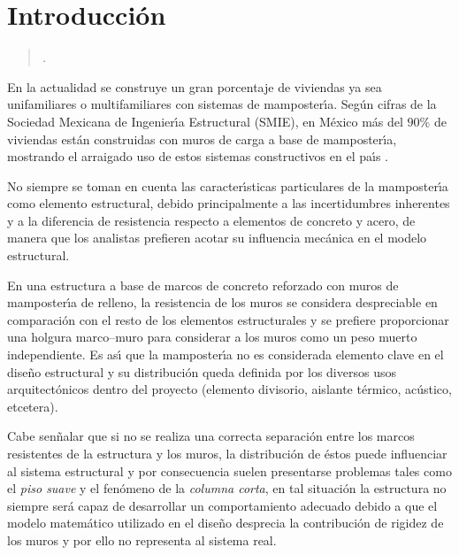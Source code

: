 
\chapter{Introducci\'on}

\begin{flushleft}
\begin{verse}
	\emph{.}
\newline
\end{verse}
\end{flushleft}


En la actualidad se construye un gran porcentaje de viviendas ya sea unifamiliares o multifamiliares con sistemas de mamposter\'{\i}a. Seg\'un cifras de la Sociedad Mexicana de Ingenier\'{\i}a Estructural (SMIE), en M\'exico m\'as del $90\%$ de viviendas est\'an construidas con muros de carga a base de mamposter\'{\i}a, mostrando el arraigado uso de estos sistemas constructivos en el pa\'{\i}s \cite{ICA2003}.  

No siempre se toman en cuenta las caracter\'{\i}sticas particulares de la mamposter\'{\i}a como elemento estructural, debido principalmente a las incertidumbres inherentes y a la diferencia de resistencia respecto a elementos de concreto y acero, de manera que los analistas prefieren acotar su influencia mec\'anica en el modelo estructural.

En una estructura a base de marcos de concreto reforzado con muros de mamposter\'{\i}a de relleno, la resistencia de los muros se considera despreciable en comparaci\'on con el resto de los elementos estructurales y se prefiere proporcionar una holgura marco--muro para considerar a los muros como un peso muerto independiente. Es as\'{\i} que la mamposter\'{\i}a no es considerada elemento clave en el dise\~no estructural y su distribuci\'on queda definida por los diversos usos arquitect\'onicos dentro del proyecto (elemento divisorio, aislante t\'ermico, ac\'ustico, etcetera). 

Cabe sen\~nalar que si no se realiza una correcta separaci\'on entre los marcos resistentes de la estructura y los muros, la distribuci\'on de \'estos puede influenciar al sistema estructural y por consecuencia suelen presentarse problemas tales como el \emph{piso suave} y el fen\'omeno de la \emph{columna corta}, en tal situaci\'on la estructura no siempre ser\'a capaz de desarrollar un comportamiento adecuado debido a que el modelo matem\'atico  utilizado en el dise\~no desprecia la contribuci\'on de rigidez de los muros y por ello no representa al sistema real. 

